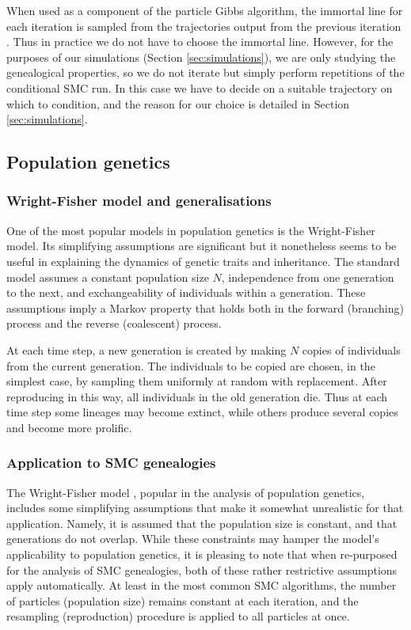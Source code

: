 \documentclass{article}
\begin{document}
When used as a component of the particle Gibbs algorithm, the immortal line for each iteration is sampled from the trajectories output from the previous iteration \citep[Section 2.4.3]{andrieu2010}. Thus in practice we do not have to choose the immortal line. However, for the purposes of our simulations (Section \ref{sec:simulations}), we are only studying the genealogical properties, so we do not iterate but simply perform repetitions of the conditional SMC run. In this case we have to decide on a suitable trajectory on which to condition, and the reason for our choice is detailed in Section \ref{sec:simulations}.


\subsection{Population genetics}\label{sec:popgen}
\subsubsection{Wright-Fisher model and generalisations}
One of the most popular models in population genetics is the Wright-Fisher model. Its simplifying assumptions are significant but it nonetheless seems to be useful in explaining the dynamics of genetic traits and inheritance. 
The standard model assumes a constant population size $N$, independence from one generation to the next, and exchangeability of individuals within a generation. These assumptions imply a Markov property that holds both in the forward (branching) process and the reverse (coalescent) process.

At each time step, a new generation is created by making $N$ copies of individuals from the current generation. The individuals to be copied are chosen, in the simplest case, by sampling them uniformly at random with replacement. After reproducing in this way, all individuals in the old generation die. Thus at each time step some lineages may become extinct, while others produce several copies and become more prolific.

 
\subsubsection{Application to SMC genealogies}
The Wright-Fisher model \citep[Chapter 3]{wakeley2009}, popular in the analysis of population genetics, includes some simplifying assumptions that make it somewhat unrealistic for that application. Namely, it is assumed that the population size is constant, and that generations do not overlap. 
While these constraints may hamper the model's applicability to population genetics, it is pleasing to note that when re-purposed for the analysis of SMC genealogies, both of these rather restrictive assumptions apply automatically. At least in the most common SMC algorithms, the number of particles (population size) remains constant at each iteration, and the resampling (reproduction) procedure is applied to all particles at once.
\end{document}
